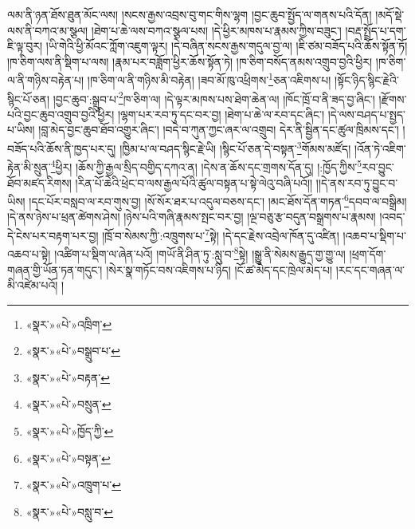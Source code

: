 \documentclass[12pt,a4paper]{book}
\begin{document}
ལམ་ནི་ཉན་ཐོས་ཐུན་མོང་ལས། །སངས་རྒྱས་འབྲས་བུ་གང་གིས་ལྷག །བྱང་ཆུབ་སྤྱོད་ལ་གནས་པའི་དོན། །མདོ་སྡེ་ལས་ནི་བཀའ་མ་སྩལ། །ཐེག་པ་ཆེ་ལས་བཀའ་སྩལ་པས། །དེ་ཕྱིར་མཁས་པ་རྣམས་ཀྱིས་བཟུང་། །བརྡ་སྤྲོད་པ་དག་ཇི་ལྟ་བུར། །ཡི་གེའི་ཕྱི་མོའང་ཀློག་འཇུག་ལྟར། །དེ་བཞིན་སངས་རྒྱས་གདུལ་བྱ་ལ། །ཇི་ཙམ་བཟོད་པའི་ཆོས་སྟོན་ཏོ། །ཁ་ཅིག་ལས་ནི་སྡིག་པ་ལས། །རྣམ་པར་བཟློག་ཕྱིར་ཆོས་སྟོན་ཏེ། །ཁ་ཅིག་བསོད་ནམས་འགྲུབ་བྱའི་ཕྱིར། །ཁ་ཅིག་ལ་ནི་གཉིས་བརྟེན་པ། །ཁ་ཅིག་ལ་ནི་གཉིས་མི་བརྟེན། །ཟབ་མོ་ཁུ་འཕྲིགས་\footnote{«སྣར་»«པེ་»འཁྲིག་}ཅན་འཇིགས་པ། །སྟོང་ཉིད་སྙིང་རྗེའི་སྙིང་པོ་ཅན། །བྱང་ཆུབ་:སྒྲུབ་པ་\footnote{«སྣར་»«པེ་»བསྒྲུབ་པ་}ཁ་ཅིག་ལ། །དེ་ལྟར་མཁས་པས་ཐེག་ཆེན་ལ། །ཁོང་ཁྲོ་བ་ནི་ཟད་བྱ་ཞིང་། །རྫོགས་པའི་བྱང་ཆུབ་འགྲུབ་བྱའི་ཕྱིར། །ལྷག་པར་རབ་ཏུ་དང་བར་བྱ། །ཐེག་པ་ཆེ་ལ་རབ་དང་ཞིང་། །དེ་ལས་བཤད་པ་སྤྱད་པ་ཡིས། །བླ་མེད་བྱང་ཆུབ་ཐོབ་འགྱུར་ཞིང་། །བདེ་བ་ཀུན་ཀྱང་ཞར་ལ་འགྲུབ། དེར་ནི་སྦྱིན་དང་ཚུལ་ཁྲིམས་དང་། །བཟོད་པའི་ཆོས་ནི་ཁྱད་པར་དུ། །ཁྱིམ་པ་ལ་བཤད་སྙིང་རྗེ་ཡི། །སྙིང་པོ་ཅན་དེ་བསྟན་\footnote{«སྣར་»«པེ་»བརྟན་}གོམས་མཛོད། །འོན་ཏེ་འཇིག་རྟེན་མི་སྲུན་\footnote{«སྣར་»«པེ་»བསྲུན་}ཕྱིར། །ཆོས་ཀྱི་རྒྱལ་སྲིད་བགྱིད་དཀའ་ན། །དེས་ན་ཆོས་དང་གྲགས་དོན་དུ། །:ཁྱོད་ཀྱིས་\footnote{«སྣར་»«པེ་»ཁྱོད་ཀྱི་}རབ་བྱུང་ཐོབ་མཛད་རིགས། །རིན་པོ་ཆེའི་ཕྲེང་བ་ལས་རྒྱལ་པོའི་ཚུལ་བསྟན་པ་སྟེ་ལེའུ་བཞི་པའོ།། །།དེ་ནས་རབ་ཏུ་བྱུང་བ་ཡིས། །དང་པོར་བསླབ་ལ་རབ་གུས་བྱ། །སོ་སོར་ཐར་པ་འདུལ་བཅས་དང་། །མང་ཐོས་དོན་གཏན་\footnote{«སྣར་»«པེ་»བསྟན་}དབབ་ལ་བསྒྲིམ། །དེ་ནས་ཉེས་པ་ཕྲན་ཚེགས་ཤེས། །ཉེས་པའི་གཞི་རྣམས་སྤང་བར་བྱ། །ལྔ་བཅུ་རྩ་བདུན་བསྒྲགས་པ་རྣམས། །འབད་དེ་ངེས་པར་བརྟག་པར་བྱ། །ཁྲོ་བ་སེམས་ཀྱི་:འཁྲུགས་པ་\footnote{«སྣར་»«པེ་»འཁྲུག་པ་}སྟེ། །དེ་དང་རྗེས་འབྲེལ་ཁོན་དུ་འཛིན། །འཆབ་པ་སྡིག་པ་འཆབ་པ་སྟེ། །འཚིག་པ་སྡིག་ལ་ཞེན་པའོ། །གཡོ་ནི་ཤིན་ཏུ་:སླུ་བ་\footnote{«སྣར་»«པེ་»བསླུ་བ་}སྟེ། །སྒྱུ་ནི་སེམས་རྒྱུད་གྱ་གྱུ་ལ། །ཕྲག་དོག་གཞན་གྱི་ཡོན་ཏན་གདུང་། །སེར་སྣ་གཏོང་བས་འཇིགས་པ་ཉིད། །ངོ་ཚ་མེད་དང་ཁྲེལ་མེད་པ། །རང་དང་གཞན་ལ་མི་འཛེམ་པའོ། །
\end{document}
